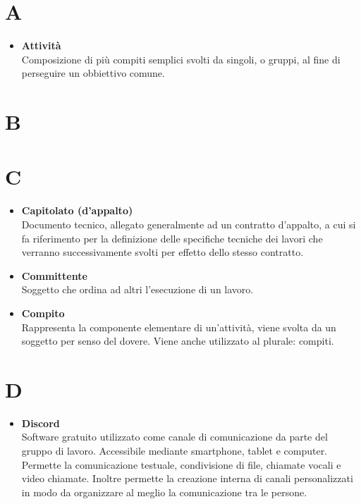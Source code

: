 


\tableofcontents{}
\chapter{A}
	\begin{itemize}
		\item \textbf{Attività}\\
		Composizione di più compiti semplici svolti da singoli, o gruppi, al fine di perseguire un obbiettivo comune.
	\end{itemize}
\chapter{B}
\chapter{C}
	\begin{itemize}
		\item \textbf{Capitolato (d'appalto)}\\
		Documento tecnico, allegato generalmente ad un contratto d'appalto, a cui si fa riferimento per la definizione delle specifiche tecniche dei lavori che verranno successivamente svolti per effetto dello stesso contratto.
		\item \textbf{Committente}\\
		Soggetto che ordina ad altri l'esecuzione di un lavoro.

		\item \textbf{Compito}\\
		Rappresenta la componente elementare di un'attività, viene svolta da un soggetto per senso del dovere.
		Viene anche utilizzato al plurale: compiti.
	\end{itemize}
\chapter{D}
	\begin{itemize}
		\item \textbf{Discord}\\
		Software gratuito utilizzato come canale di comunicazione da parte del gruppo di lavoro.
		Accessibile mediante smartphone, tablet e computer.
		Permette la comunicazione testuale, condivisione di file, chiamate vocali e video chiamate.
		Inoltre permette la creazione interna di canali personalizzati in modo da organizzare al meglio la comunicazione tra le persone.
	\end{itemize}
